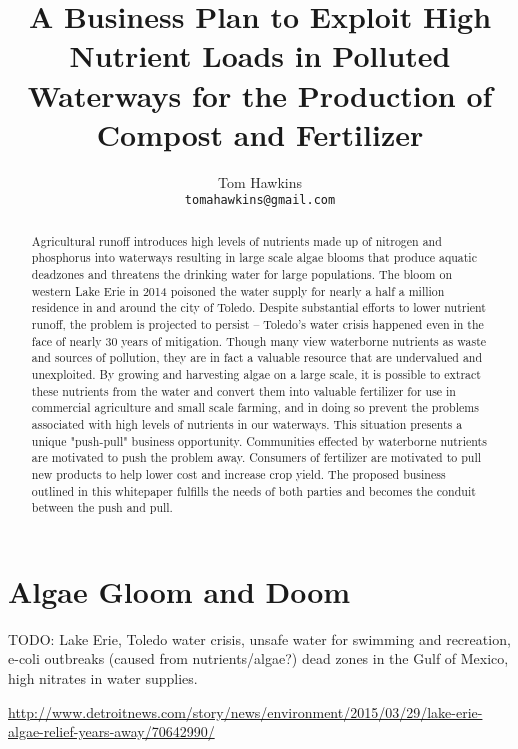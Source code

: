 \documentclass{article}
\title{A Business Plan to Exploit High
Nutrient Loads in Polluted Waterways for the
Production of Compost and Fertilizer}
\author{Tom Hawkins \\ \texttt{tomahawkins@gmail.com}}
\begin{document}
\maketitle

\begin{abstract}
Agricultural runoff introduces high levels of nutrients
made up of nitrogen and phosphorus
into waterways resulting in large scale algae blooms that 
produce aquatic deadzones and threatens the drinking water
for large populations.
The bloom on western Lake Erie in 2014 poisoned the water supply
for nearly a half a million residence in and around the city of Toledo.
Despite substantial efforts to lower nutrient runoff,
the problem is projected to persist -- Toledo's water
crisis happened even in the face of nearly 30 years of mitigation.  
Though many view waterborne nutrients as waste and sources of pollution,
they are in fact a valuable resource that are undervalued and unexploited.
By growing and harvesting algae on a large scale,
it is possible to extract these nutrients from the water
and convert them into valuable fertilizer for use in
commercial agriculture and small scale farming,
and in doing so prevent the problems associated with high levels of
nutrients in our waterways.
This situation presents a unique "push-pull" business opportunity.
Communities effected by waterborne nutrients are motivated to
push the problem away.  Consumers of fertilizer are motivated
to pull new products to help lower cost and increase crop yield.
The proposed business outlined in this whitepaper fulfills the needs
of both parties and becomes the conduit between the push and pull.
\end{abstract}

\section{Algae Gloom and Doom}

TODO:
Lake Erie, Toledo water crisis, 
unsafe water for swimming and recreation,
e-coli outbreaks (caused from nutrients/algae?)
dead zones in the Gulf of Mexico,
high nitrates in water supplies.

\url{http://www.detroitnews.com/story/news/environment/2015/03/29/lake-erie-algae-relief-years-away/70642990/}


\end{document}
